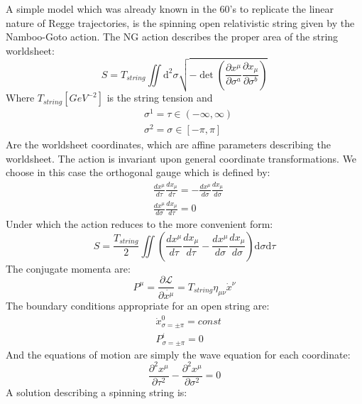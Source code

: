 \documentclass[11pt,a4paper]{article}
\begin{document}
A simple model which was already known in the 60's \cite{Collins} to replicate the linear nature of Regge trajectories, is the spinning open relativistic string given by the Namboo-Goto action. The NG action describes the proper area of the string worldsheet:
\begin{equation}
S=T_{string}\iint \mathrm{d}^2\sigma \sqrt{-\det\left(\frac{\partial x^\mu}{\partial \sigma^a}\frac{\partial x_\mu}{\partial \sigma^b}\right)}
\end{equation}
Where $T_{string}\left[GeV^{-2}\right]$ is the string tension and
\begin{align}
&\sigma^1=\tau\in\left(-\infty,\infty\right)\\
&\sigma^2=\sigma\in\left[-\pi,\pi\right]
\end{align}
Are the worldsheet coordinates, which are affine parameters describing the worldsheet. The action is invariant upon general coordinate transformations. We choose in this case the orthogonal gauge which is defined by:
\begin{subequations}
\begin{align}
&\frac{dx^\mu}{d\tau} \frac{dx_\mu}{d\tau}=-\frac{dx^\mu}{d\sigma}\frac{dx_\mu}{d\sigma}\\
&\frac{dx^\mu}{d\sigma} \frac{dx_\mu}{d\tau}=0
\end{align}
\end{subequations}
Under which the action reduces to the more convenient form:
\begin{equation}
S=\frac{T_{string}}{2}\iint \left( \frac{dx^\mu}{d\tau} \frac{dx_\mu}{d\tau}-\frac{dx^\mu}{d\sigma} \frac{dx_\mu}{d\sigma} \right)\mathrm{d}\sigma\mathrm{d}\tau
\end{equation}
The conjugate momenta are:
\begin{equation}
P^\mu=\frac{\partial \mathcal{L}}{\partial \dot{x^\mu}}=T_{string} \eta_{\mu\nu}\dot{x}^\nu 
\end{equation}
The boundary conditions appropriate for an open string are:
\begin{subequations}
\begin{align}
&\dot{x}^0_{\sigma=\pm\pi}=const\\
&P^i_{\sigma=\pm\pi}=0
\end{align}
\end{subequations}
And the equations of motion are simply the wave equation for each coordinate:
\begin{equation}
\frac{\partial^2 {x}^\mu}{\partial \tau^2}-\frac{\partial^2 {x}^\mu}{\partial \sigma^2}=0
\end{equation}
A solution describing a spinning string is:
\end{document}
